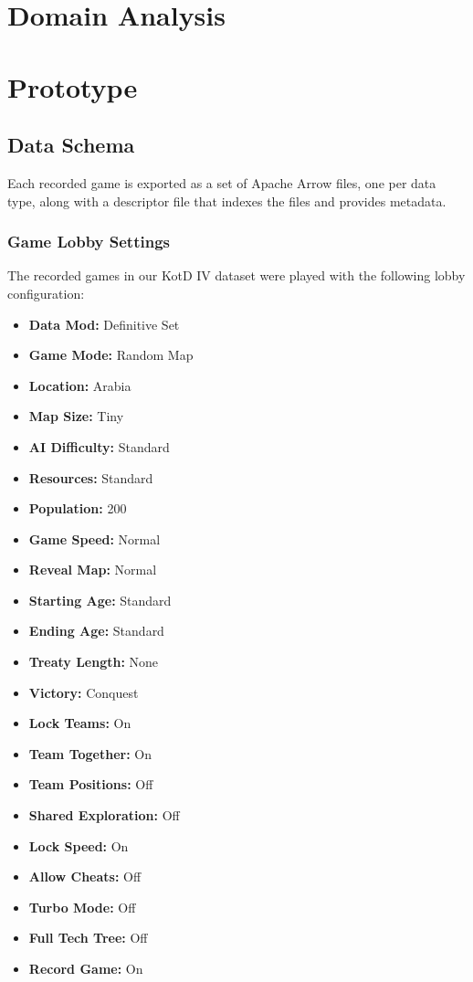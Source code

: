
\chapter{Domain Analysis}


\chapter{Prototype}
\label{appendix:prototype}

\section{Data Schema}
\label{appendix:data-schema}
Each recorded game is exported as a set of Apache Arrow files, one per data type, along with a descriptor file that indexes the files and provides metadata.

\subsection{Game Lobby Settings}
\label{appendix:lobby-settings}
The recorded games in our KotD IV dataset were played with the following lobby configuration:
\begin{itemize}[noitemsep,topsep=0pt]
  \item \textbf{Data Mod:} Definitive Set
  \item \textbf{Game Mode:} Random Map
  \item \textbf{Location:} Arabia
  \item \textbf{Map Size:} Tiny
  \item \textbf{AI Difficulty:} Standard
  \item \textbf{Resources:} Standard
  \item \textbf{Population:} 200
  \item \textbf{Game Speed:} Normal
  \item \textbf{Reveal Map:} Normal
  \item \textbf{Starting Age:} Standard
  \item \textbf{Ending Age:} Standard
  \item \textbf{Treaty Length:} None
  \item \textbf{Victory:} Conquest
  \item \textbf{Lock Teams:} On
  \item \textbf{Team Together:} On
  \item \textbf{Team Positions:} Off
  \item \textbf{Shared Exploration:} Off
  \item \textbf{Lock Speed:} On
  \item \textbf{Allow Cheats:} Off
  \item \textbf{Turbo Mode:} Off
  \item \textbf{Full Tech Tree:} Off
  \item \textbf{Record Game:} On
\end{itemize}

